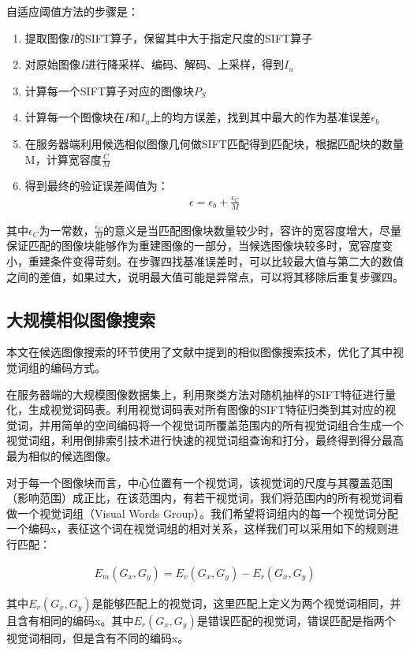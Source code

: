 \documentclass[UTF8]{csoarticle}
\begin{document}
自适应阈值方法的步骤是：
\begin{enumerate}
\item 提取图像\(I\)的SIFT算子，保留其中大于指定尺度的SIFT算子
\item 对原始图像\(I\)进行降采样、编码、解码、上采样，得到\(I_u\)
\item 计算每一个SIFT算子对应的图像块\(P_S\)
\item 计算每一个图像块在\(I\)和\(I_u\)上的均方误差，找到其中最大的作为基准误差\(\epsilon_b\)
\item 在服务器端利用候选相似图像几何做SIFT匹配得到匹配块，根据匹配块的数量M，计算宽容度\(\frac{C}{M}\)
\item 得到最终的验证误差阈值为：
\begin{align}
\epsilon = \epsilon_b + \frac{\epsilon_C}{M}
\end{align}
\end{enumerate}

其中\(\epsilon_C\)为一常数，\(\frac{\epsilon_C}{M}\)的意义是当匹配图像块数量较少时，容许的宽容度增大，尽量保证匹配的图像块能够作为重建图像的一部分，当候选图像块较多时，宽容度变小，重建条件变得苛刻。在步骤四找基准误差时，可以比较最大值与第二大的数值之间的差值，如果过大，说明最大值可能是异常点，可以将其移除后重复步骤四。

\subsection{大规模相似图像搜索}
本文在候选图像搜索的环节使用了文献\cite{Dai:2012vn}中提到的相似图像搜索技术，优化了其中视觉词组的编码方式。

在服务器端的大规模图像数据集上，利用聚类方法对随机抽样的SIFT特征进行量化，生成视觉词码表。利用视觉词码表对所有图像的SIFT特征归类到其对应的视觉词，并用简单的空间编码将一个视觉词所覆盖范围内的所有视觉词组合生成一个视觉词组，利用倒排索引技术进行快速的视觉词组查询和打分，最终得到得分最高最为相似的候选图像。

对于每一个图像块而言，中心位置有一个视觉词，该视觉词的尺度与其覆盖范围（影响范围）成正比，在该范围内，有若干视觉词，我们将范围内的所有视觉词看做一个视觉词组（Visual Words Group）。我们希望将词组内的每一个视觉词分配一个编码x，表征这个词在视觉词组的相对关系，这样我们可以采用如下的规则进行匹配：

\begin{align}
\label{eq:rate}
E_m(G_x,G_y) = E_v(G_x,G_y) - E_r(G_x,G_y)
\end{align}

其中\(E_v(G_x,G_y)\)是能够匹配上的视觉词，这里匹配上定义为两个视觉词相同，并且含有相同的编码x。其中\(E_r(G_x,G_y)\)是错误匹配的视觉词，错误匹配是指两个视觉词相同，但是含有不同的编码x。
\end{document}
